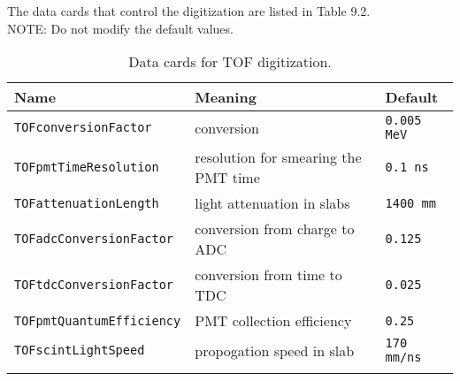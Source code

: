 The data cards that control the digitization are listed in Table 9.2. \\
NOTE: Do not modify the default values.
\begin{table*}
\begin{center}
\caption{Data cards for TOF digitization.}
\begin{tabularx}{\linewidth}{lXX}
\hline
Name & Meaning & Default\\
\hline
\verb|TOFconversionFactor| & conversion & \verb|0.005 MeV|\\
\verb|TOFpmtTimeResolution| & resolution for smearing the PMT time& \verb|0.1 ns|\\
\verb|TOFattenuationLength| & light attenuation in slabs & \verb|1400 mm|\\
\verb|TOFadcConversionFactor| & conversion from charge to ADC & \verb|0.125|\\
\verb|TOFtdcConversionFactor| & conversion from time to TDC & \verb|0.025|\\
\verb|TOFpmtQuantumEfficiency| & PMT collection efficiency & \verb|0.25| \\
\verb|TOFscintLightSpeed| & propogation speed in slab & \verb|170 mm/ns|\\
\begin{makeimage} %
\end{makeimage} 
\end{tabularx}
\end{center}
\end{table*}

